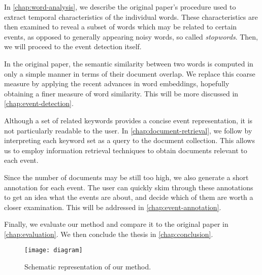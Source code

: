 In \autoref{chap:word-analysis}, we describe the original paper's procedure used to extract temporal characteristics of the individual words. These characteristics are then examined to reveal a subset of words which may be related to certain events, as opposed to generally appearing noisy words, so called \textit{stopwords}. Then, we will proceed to the event detection itself.

In the original paper, the semantic similarity between two words is computed in only a simple manner in terms of their document overlap. We replace this coarse measure by applying the recent advances in word embeddings, hopefully obtaining a finer measure of word similarity. This will be more discussed in \autoref{chap:event-detection}.

Although a set of related keywords provides a concise event representation, it is not particularly readable to the user. In \autoref{chap:document-retrieval}, we follow by interpreting each keyword set as a query to the document collection. This allows us to employ information retrieval techniques to obtain documents relevant to each event.

Since the number of documents may be still too high, we also generate a short annotation for each event. The user can quickly skim through these annotations to get an idea what the events are about, and decide which of them are worth a closer examination. This will be addressed in \autoref{chap:event-annotation}.

Finally, we evaluate our method and compare it to the original paper in \autoref{chap:evaluation}. We then conclude the thesis in \autoref{chap:conclusion}.

\begin{figure}[H]
  \centering
  \texttt{[image: diagram]}
  \caption{Schematic representation of our method.}
  \label{fig:diagram}
\end{figure}